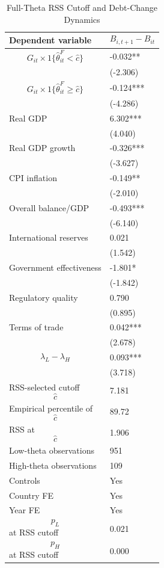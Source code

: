 \begin{table}[H]\centering
\begin{threeparttable}
\caption{Full-Theta RSS Cutoff and Debt-Change Dynamics}
\label{tab:deltaB_rss_cutoff_fulltheta}
\scriptsize
\begin{tabularx}{\textwidth}{lY}
\toprule
Dependent variable & $$B_{i,t+1}-B_{it}$$ \\
\midrule
$$G_{it}\times 1\{\widehat{\theta}^{F}_{it}<\widehat{c}\}$$ & -0.032** \\
 & (-2.306) \\
$$G_{it}\times 1\{\widehat{\theta}^{F}_{it}\geq\widehat{c}\}$$ & -0.124*** \\
 & (-4.286) \\
Real GDP & 6.302*** \\
 & (4.040) \\
Real GDP growth & -0.326*** \\
 & (-3.627) \\
CPI inflation & -0.149** \\
 & (-2.010) \\
Overall balance/GDP & -0.493*** \\
 & (-6.140) \\
International reserves & 0.021 \\
 & (1.542) \\
Government effectiveness & -1.801* \\
 & (-1.842) \\
Regulatory quality & 0.790 \\
 & (0.895) \\
Terms of trade & 0.042*** \\
 & (2.678) \\
$$\lambda_L-\lambda_H$$ & 0.093*** \\
 & (3.718) \\
\midrule
RSS-selected cutoff $$\widehat{c}$$ & 7.181 \\
Empirical percentile of $$\widehat{c}$$ & 89.72 \\
RSS at $$\widehat{c}$$ & 1.906 \\
Low-theta observations & 951 \\
High-theta observations & 109 \\
Controls & Yes \\
Country FE & Yes \\
Year FE & Yes \\
$$p_L$$ at RSS cutoff & 0.021 \\
$$p_H$$ at RSS cutoff & 0.000 \\

\end{tabularx}
\end{threeparttable}
\end{table}
